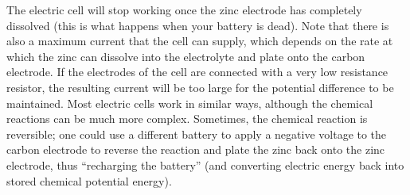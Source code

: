The electric cell will stop working once the zinc electrode has completely dissolved (this is what happens when your battery is dead). Note that there is also a maximum current that the cell can supply, which depends on the rate at which the zinc can dissolve into the electrolyte and plate onto the carbon electrode. If the electrodes of the cell are connected with a very low resistance resistor, the resulting current will be too large for the potential difference to be maintained. Most electric cells work in similar ways, although the chemical reactions can be much more complex. Sometimes, the chemical reaction is reversible; one could use a different battery to apply a negative voltage to the carbon electrode to reverse the reaction and plate the zinc back onto the zinc electrode, thus ``recharging the battery'' (and converting electric energy back into stored chemical potential energy). 

